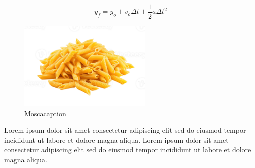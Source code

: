 \documentclass{article}
\begin{document}
		\begin{equation}
			y_f = y_o + v_o\Delta t + \frac{1}{2}a\Delta t^2
		\end{equation}

		\begin{figure}[H]
            \centering
            \includegraphics[width=2.5in]{mosca.png}
            \caption{Moscacaption}
            \label{fig:Moscalable}
        \end{figure}

		Lorem ipsum dolor sit amet consectetur adipiscing elit sed do eiusmod tempor incididunt ut labore et dolore magna aliqua. 
		Lorem ipsum dolor sit amet consectetur adipiscing elit sed do eiusmod tempor incididunt ut labore et dolore magna aliqua. 
\end{document}
